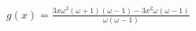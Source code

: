 \documentclass[preview]{standalone}
\begin{document}
\begin{center}
$g(x)=\frac{3x\omega^2(\omega+1)(\omega-1)-3x^2\omega(\omega-1)}{\omega(\omega-1)}$
\end{center}
\end{document}
